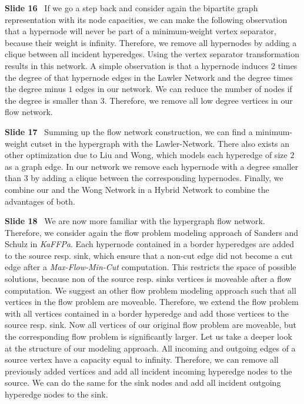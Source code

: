 \documentclass[11pt]{llncs}
\newcommand{\fakepar}[1]{\medskip\par\textbf{#1}\ }
\begin{document}
\fakepar{Slide 16} If we go a step back and consider again the bipartite graph representation
with its node capacities, we can make the following observation that a hypernode will never
be part of a minimum-weight vertex separator, because their weight is infinity. Therefore,
we remove all hypernodes by adding a clique between all incident hyperedges. Using the vertex
separator transformation results in this network. A simple observation is that a hypernode
induces $2$ times the degree of that hypernode edges in the Lawler Network and the degree times
the degree minus $1$ edges in our network. We can reduce the number of nodes if the 
degree is smaller than $3$. Therefore, we remove all low degree vertices in our flow network.

\fakepar{Slide 17} Summing up the flow network construction, we can find a minimum-weight cutset
in the hypergraph with the Lawler-Network. There also exists an other optimization due to Liu and
Wong, which models each hyperedge of size $2$ as a graph edge. In our network we remove each hypernode
with a degree smaller than $3$ by adding a clique between the corresponding hypernodes. Finally, we
combine our and the Wong Network in a Hybrid Network to combine the advantages of both.

\fakepar{Slide 18} We are now more familiar with the hypergraph flow network. Therefore, we consider
again the flow problem modeling approach of Sanders and Schulz in \emph{KaFFPa}. Each hypernode
contained in a border hyperedges are added to the source resp. sink, which ensure that a non-cut edge
did not become a cut edge after a \emph{Max-Flow-Min-Cut} computation. This restricts the space of
possible solutions, because non of the source resp. sinks vertices is moveable after a flow 
computation. We suggest an other flow problem modeling approach such that all vertices
in the flow problem are moveable. Therefore, we extend the flow problem with all vertices contained
in a border hyperedge and add those vertices to the source resp. sink. Now all vertices of our original
flow problem are moveable, but the corresponding flow problem is significantly larger. Let us take a
deeper look at the structure of our modeling approach. All incoming and outgoing edges of a source vertex
have a capacity equal to infinity. Therefore, we can remove all previously added vertices and add
all incident incoming hyperedge nodes to the source. We can do the same for the sink nodes and
add all incident outgoing hyperedge nodes to the sink.
\end{document}
